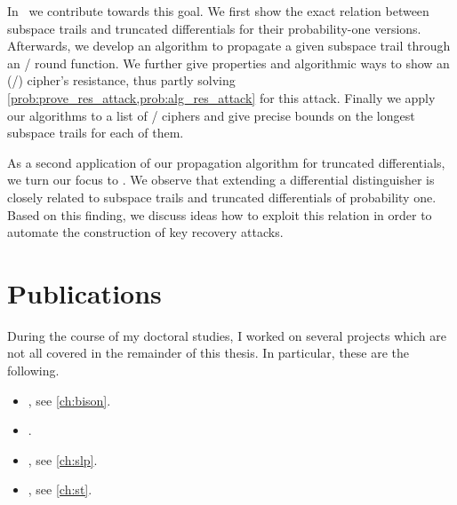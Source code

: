 In~\cite{ToSC:LeaTezWie18} we contribute towards this goal.
We first show the exact relation between subspace trails and truncated differentials for their probability-one versions.
Afterwards, we develop an algorithm to propagate a given subspace trail through an \SPN/ round function.
We further give properties and algorithmic ways to show an (\SPN/) cipher's resistance, thus partly solving \cref{prob:prove_res_attack,prob:alg_res_attack} for this attack.
Finally we apply our algorithms to a list of \SPN/ ciphers and give precise bounds on the longest subspace trails for each of them.

As a second application of our propagation algorithm for truncated differentials, we turn our focus to .
We observe that extending a differential distinguisher is closely related to subspace trails and truncated differentials of probability one.
Based on this finding, we discuss ideas how to exploit this relation in order to automate the construction of key recovery attacks.

\section{Publications}

During the course of my doctoral studies, I worked on several projects which are not all covered in the remainder of this thesis.
In particular, these are the following.

\begin{itemize}
    \item[] , see \cref{ch:bison}.
\end{itemize}

\begin{itemize}
    \item[] .
    \item[] , see \cref{ch:slp}.
    \item[] , see \cref{ch:st}.
\end{itemize}


